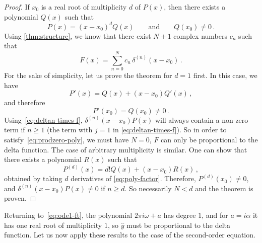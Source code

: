 \begin{proof}
  If $x_0$ is a real root of multiplicity $d$ of $P(x)$, then there exists a polynomial
  $Q(x)$ such that
  \begin{equation}
    P(x)=(x-x_0)^dQ(x)\qquad\text{and}\qquad Q(x_0)\neq 0\,.\label{eq:poly-factor}
  \end{equation}
  Using \cref{thm:structure}, we know that there exist $N+1$ complex numbers $c_n$ such
  that
  \begin{equation}
    F(x)=\sum_{n=0}^{N}c_n\,\delta^{(n)}(x-x_0)\,.
  \end{equation}
  For the sake of simplicity, let us prove the theorem for $d=1$ first. In this case, we
  have
  \begin{equation}
    P'(x)=Q(x)+(x-x_0)Q'(x)\,,
  \end{equation}
  and therefore
  \begin{equation}
    P'(x_0)=Q(x_0)\neq 0\,.
  \end{equation}
  Using~\cref{eq:deltan-times-f}, $\delta^{(n)}(x-x_0)P(x)$ will always contain a non-zero
  term if $n\geq 1$ (\ie the term with $j=1$ in \cref{eq:deltan-times-f}). So in order to
  satisfy~\cref{eq:prodzero-poly}, we must have $N=0$, \ie $F$ can only be proportional to
  the delta function. The case of arbitrary multiplicity is similar. One can show that
  there exists a polynomial $R(x)$ such that
  \begin{equation}
    P^{(d)}(x)=d!Q(x)+(x-x_0)R(x)\,,
  \end{equation}
  obtained by taking $d$ derivatives of \cref{eq:poly-factor}. Therefore,
  $P^{(d)}(x_0)\neq 0$, and $\delta^{(n)}(x-x_0)P(x)\neq 0$ if $n\geq d$. So necessarily
  $N<d$ and the theorem is proven.
\end{proof}
Returning to~\cref{eq:ode1-ft}, the polynomial $2\pi i\omega +a$ has degree $1$, and for
$a=i\alpha$ it has one real root of multiplicity $1$, so $\hat{y}$ must be proportional to
the delta function. Let us now apply these results to the case of the second-order
equation.

